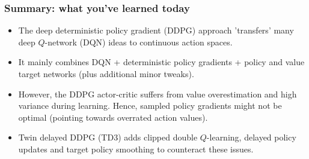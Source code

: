 \begin{frame}
  \frametitle{Summary: what you've learned today}
  \begin{itemize}
  \item The deep deterministic policy gradient (DDPG) approach 'transfers' many deep $Q$-network (DQN) ideas to continuous action spaces.\pause
  \item It mainly combines DQN + deterministic policy gradients + policy and value target networks (plus additional minor tweaks).\pause
  \item However, the DDPG actor-critic suffers from value overestimation and high variance during learning. Hence, sampled policy gradients might not be optimal (pointing towards overrated action values).\pause
  \item Twin delayed DDPG (TD3) adds clipped double $Q$-learning, delayed policy updates and target policy smoothing to counteract these issues.
  \end{itemize}
\end{frame}
